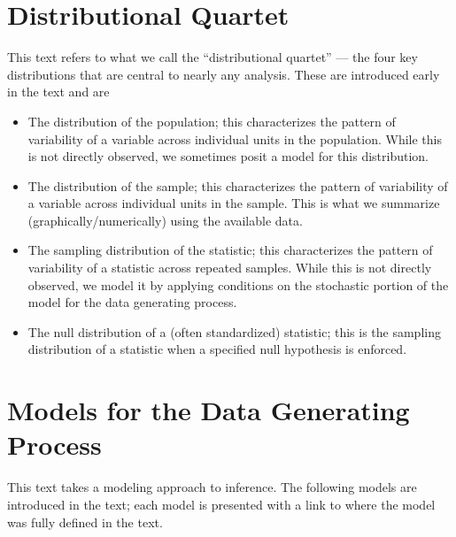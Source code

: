 \documentclass[
  letterpaper,
  DIV=11,
  numbers=noendperiod]{scrreprt}
\providecommand{\tightlist}{%
  \setlength{\itemsep}{0pt}\setlength{\parskip}{0pt}}\usepackage{longtable,booktabs,array}
\theoremstyle{definition}
\theoremstyle{definition}
\theoremstyle{plain}
\theoremstyle{remark}
\begin{document}
\hypertarget{distributional-quartet}{%
\section{Distributional Quartet}\label{distributional-quartet}}

This text refers to what we call the ``distributional quartet'' --- the
four key distributions that are central to nearly any analysis. These
are introduced early in the text and are

\begin{itemize}
\tightlist
\item
  The distribution of the population; this characterizes the pattern of
  variability of a variable across individual units in the population.
  While this is not directly observed, we sometimes posit a model for
  this distribution.
\item
  The distribution of the sample; this characterizes the pattern of
  variability of a variable across individual units in the sample. This
  is what we summarize (graphically/numerically) using the available
  data.
\item
  The sampling distribution of the statistic; this characterizes the
  pattern of variability of a statistic across repeated samples. While
  this is not directly observed, we model it by applying conditions on
  the stochastic portion of the model for the data generating process.
\item
  The null distribution of a (often standardized) statistic; this is the
  sampling distribution of a statistic when a specified null hypothesis
  is enforced.
\end{itemize}

\hypertarget{models-for-the-data-generating-process}{%
\section{Models for the Data Generating
Process}\label{models-for-the-data-generating-process}}

This text takes a modeling approach to inference. The following models
are introduced in the text; each model is presented with a link to where
the model was fully defined in the text.
\end{document}
